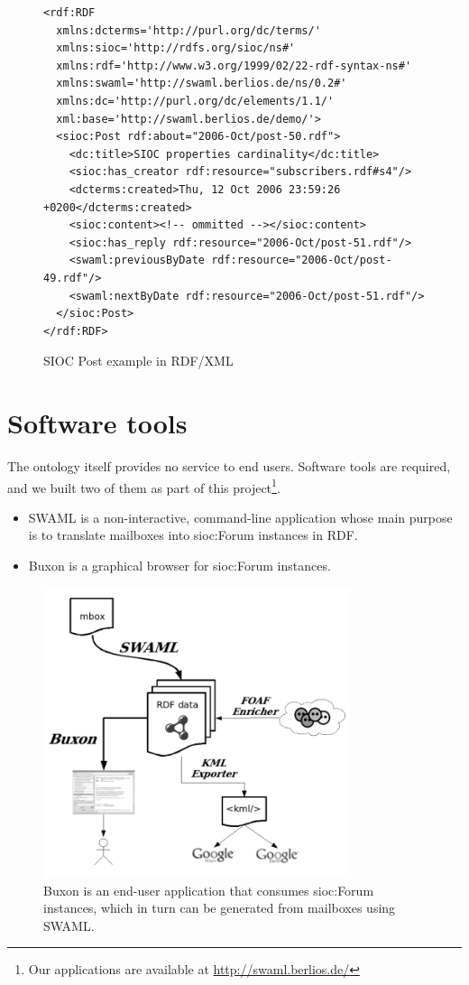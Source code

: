 \documentclass{llncs}
\begin{document}
\begin{figure}[ht]
\lstset{language=RDF}
\begin{lstlisting}
<rdf:RDF
  xmlns:dcterms='http://purl.org/dc/terms/'
  xmlns:sioc='http://rdfs.org/sioc/ns#'
  xmlns:rdf='http://www.w3.org/1999/02/22-rdf-syntax-ns#'
  xmlns:swaml='http://swaml.berlios.de/ns/0.2#'
  xmlns:dc='http://purl.org/dc/elements/1.1/'
  xml:base='http://swaml.berlios.de/demo/'>
  <sioc:Post rdf:about="2006-Oct/post-50.rdf">
    <dc:title>SIOC properties cardinality</dc:title>
    <sioc:has_creator rdf:resource="subscribers.rdf#s4"/>
    <dcterms:created>Thu, 12 Oct 2006 23:59:26 +0200</dcterms:created>
    <sioc:content><!-- ommitted --></sioc:content>
    <sioc:has_reply rdf:resource="2006-Oct/post-51.rdf"/>
    <swaml:previousByDate rdf:resource="2006-Oct/post-49.rdf"/>
    <swaml:nextByDate rdf:resource="2006-Oct/post-51.rdf"/>
  </sioc:Post>
</rdf:RDF>
\end{lstlisting}
\caption{SIOC Post example in RDF/XML}
\label{fig:rdfexample}
\end{figure}

\section{\label{sec:tools}Software tools}

The ontology itself provides no service to end users. Software tools
are required, and we built two of them as part of this
project\footnote{Our applications are available at \url{http://swaml.berlios.de/}}.

\begin{itemize}
  \item SWAML is a non-interactive, command-line application whose main
	purpose is to translate mailboxes into \textsf{sioc:Forum}
        instances in RDF.
  \item Buxon is a graphical browser for \textsf{sioc:Forum} instances.
\end{itemize}

\begin{figure}[ht]
 \centering
 \includegraphics[width=9cm]{images/swaml.png}
 \caption{\label{fig:swaml-and-buxon}Buxon is an end-user application
that consumes
\textsf{sioc:Forum} instances, which in turn can be generated from mailboxes
using SWAML.}
\end{figure}
\end{document}
